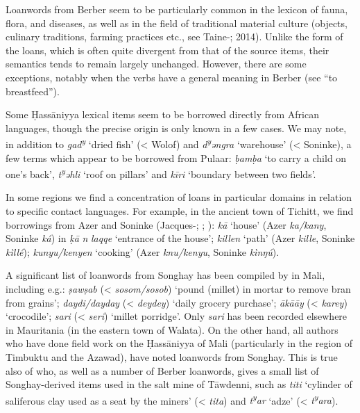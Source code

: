 \documentclass[output=paper]{langsci/langscibook}
\begin{document}
Loanwords from Berber seem to be particularly common in the lexicon of fauna, flora, and diseases, as well as in the field of traditional material culture (objects, culinary traditions, farming practices etc., see Taine-\citealt{Cheikh2010b}; 2014). Unlike the form of the loans, which is often quite divergent from that of the source items, their semantics tends to remain largely unchanged. However, there are some exceptions, notably when the verbs have a general meaning in Berber (see “to breastfeed”). 


Some Ḥassāniyya lexical items seem to be borrowed directly from African languages, though the precise origin is only known in a few cases. We may note, in addition to \textit{gad\textsuperscript{y} }‘dried fish’ (< Wolof) and \textit{d\textsuperscript{y}}\textit{əngra} ‘warehouse’ (< Soninke), a few terms which appear to be borrowed from Pulaar: \textit{ḅamḅa} ‘to carry a child on one’s back’, \textit{t\textsuperscript{y}}\textit{əhli} ‘roof on pillars’ and \textit{kīri} ‘boundary between two fields’.

In some regions we find a concentration of loans in particular domains in relation to specific contact languages. For example, in the ancient town of Tichitt, we find borrowings from Azer and Soninke (Jacques-\citealt{Meunié1961}; \citealt{Monteil1939}; \citealt{Diagana2013}): \textit{kā} ‘house’ (Azer \textit{ka/kany}, Soninke \textit{ká}) in \textit{ḳā} \textit{n} \textit{laqqe} ‘entrance of the house’; \textit{killen} ‘path’ (Azer \textit{kille}, Soninke \textit{kìllé}); \textit{kunyu/kenyen} ‘cooking’ (Azer \textit{knu/kenyu}, Soninke \textit{kìnŋú}).

A significant list of loanwords from Songhay has been compiled by \citet{Heath2004} in Mali, including e.g.: \textit{ṣawṣab} (< \textit{sosom/sosob}) ‘pound (millet) in mortar to remove bran from grains’; \textit{daydi/dayday} (< \textit{deydey}) ‘daily grocery purchase’; \textit{ākā{\R}āy} (< \textit{karey}) ‘crocodile’; \textit{sari} (< \textit{seri}) ‘millet porridge’. Only \textit{sari} has been recorded elsewhere in Mauritania (in the eastern town of Walata). On the other hand, all authors who have done field work on the Ḥassāniyya of Mali (particularly in the region of Timbuktu and the Azawad), have noted loanwords from Songhay. This is true also of \citet{Clauzel1960} who, as well as a number of Berber loanwords, gives a small list of Songhay-derived items used in the salt mine of Tāwdenni, such as \textit{titi} ‘cylinder of saliferous clay used as a seat by the miners’ (< \textit{tita}) and \textit{t\textsuperscript{y}}\textit{ar} ‘adze’ (< \textit{t\textsuperscript{y}}\textit{ara}).
\end{document}
